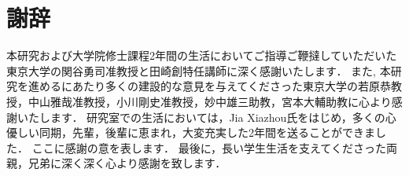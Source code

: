 \chapter*{謝辞}


本研究および大学院修士課程2年間の生活においてご指導ご鞭撻していただいた東京大学の関谷勇司准教授と田崎創特任講師に深く感謝いたします．
また,
本研究を進めるにあたり多くの建設的な意見を与えてくださった東京大学の若原恭教授，中山雅哉准教授，小川剛史准教授，妙中雄三助教，宮本大輔助教に心より感謝いたします． 研究室での生活においては，Jia Xiazhou氏をはじめ，多くの心優しい同期，先輩，後輩に恵まれ，大変充実した2年間を送ることができました．
ここに感謝の意を表します．
最後に，長い学生生活を支えてくださった両親，兄弟に深く深く心より感謝を致します．